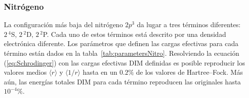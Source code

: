 \subsubsection{Nitrógeno}

La configuración más baja del nitrógeno $2p^3$ da lugar a tres términos
diferentes: $2\,^4$S, $2\,^2$D, $2\,^2$P. Cada uno de estos términos 
está descrito por una densidad electrónica diferente. Los parámetros 
que definen las cargas efectivas para cada término están dados en la 
tabla~\ref{tab:parametersNitro}. Resolviendo la ecuación (\ref{eq:Schrodinger}) 
con las cargas efectivas DIM definidas es posible reproducir los valores 
medios $\langle r \rangle$ y $\langle 1/r \rangle$ hasta en un $0.2\%$ 
de los valores de Hartree--Fock. Más aún, las energías totales DIM para 
cada término reproducen las originales hasta $10^{-4}\%$. 

